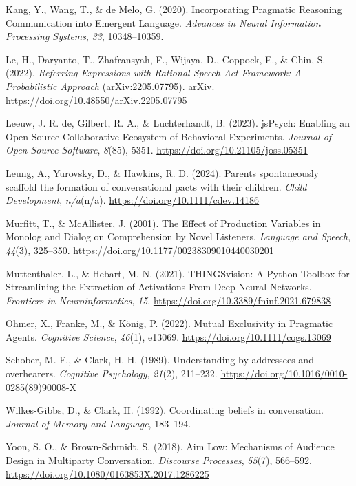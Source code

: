 \documentclass[10pt, letterpaper]{article}
\begin{document}
\begin{CSLReferences}{1}{0}
Kang, Y., Wang, T., \& de Melo, G. (2020). Incorporating {Pragmatic
Reasoning Communication} into {Emergent Language}. \emph{Advances in
{Neural Information Processing Systems}}, \emph{33}, 10348--10359.

Le, H., Daryanto, T., Zhafransyah, F., Wijaya, D., Coppock, E., \& Chin,
S. (2022). \emph{Referring {Expressions} with {Rational Speech Act
Framework}: {A Probabilistic Approach}} (arXiv:2205.07795). arXiv.
\url{https://doi.org/10.48550/arXiv.2205.07795}

Leeuw, J. R. de, Gilbert, R. A., \& Luchterhandt, B. (2023). {jsPsych}:
{Enabling} an {Open-Source Collaborative Ecosystem} of {Behavioral
Experiments}. \emph{Journal of Open Source Software}, \emph{8}(85),
5351. \url{https://doi.org/10.21105/joss.05351}

Leung, A., Yurovsky, D., \& Hawkins, R. D. (2024). Parents spontaneously
scaffold the formation of conversational pacts with their children.
\emph{Child Development}, \emph{n/a}(n/a).
\url{https://doi.org/10.1111/cdev.14186}

Murfitt, T., \& McAllister, J. (2001). The {Effect} of {Production
Variables} in {Monolog} and {Dialog} on {Comprehension} by {Novel
Listeners}. \emph{Language and Speech}, \emph{44}(3), 325--350.
\url{https://doi.org/10.1177/00238309010440030201}

Muttenthaler, L., \& Hebart, M. N. (2021). {THINGSvision}: {A Python
Toolbox} for {Streamlining} the {Extraction} of {Activations From Deep
Neural Networks}. \emph{Frontiers in Neuroinformatics}, \emph{15}.
\url{https://doi.org/10.3389/fninf.2021.679838}

Ohmer, X., Franke, M., \& König, P. (2022). Mutual {Exclusivity} in
{Pragmatic Agents}. \emph{Cognitive Science}, \emph{46}(1), e13069.
\url{https://doi.org/10.1111/cogs.13069}

Schober, M. F., \& Clark, H. H. (1989). Understanding by addressees and
overhearers. \emph{Cognitive Psychology}, \emph{21}(2), 211--232.
\url{https://doi.org/10.1016/0010-0285(89)90008-X}

Wilkes-Gibbs, D., \& Clark, H. (1992). Coordinating beliefs in
conversation. \emph{Journal of Memory and Language}, 183--194.

Yoon, S. O., \& Brown-Schmidt, S. (2018). Aim {Low}: {Mechanisms} of
{Audience Design} in {Multiparty Conversation}. \emph{Discourse
Processes}, \emph{55}(7), 566--592.
\url{https://doi.org/10.1080/0163853X.2017.1286225}

\end{CSLReferences}


\end{document}
